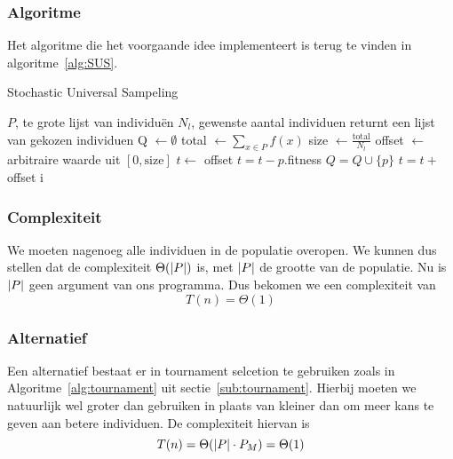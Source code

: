 \subsubsection{Algoritme}
Het algoritme die het voorgaande idee implementeert is terug te vinden in algoritme~\ref{alg:SUS}.
	\begin{algorithm}
	 	\caption{Stochastic Universal Sampeling}
		\begin{algorithmic}
		\Require 
			\State $P$, te grote lijst van individuën 
			\State $N_l$, gewenste aantal individuen
		\Ensure returnt een lijst van gekozen individuen
		\State Q $\gets \emptyset$
		\State total $\gets \sum_{x \in P} f(x)$ 
		\State size $\gets \frac{\text{total}}{N_l}$
		\State offset $\gets$ arbitraire waarde uit $\left\lbrack 0,\text{size} \right\rbrack$
		\State $t \gets$ offset
		\State $t = t-p.$fitness
			\State $Q = Q \cup \lbrace p \rbrace$
			\State $t = t+$offset
		\EndIf
		\EndFor		
		\State \Return i
		\EndFunction

		
		\end{algorithmic}
		\label{alg:SUS}
	\end{algorithm}		

\subsubsection{Complexiteit}
\label{ssub:SUSComplexity}
We moeten nagenoeg alle individuen in de populatie overopen. We kunnen dus stellen dat de complexiteit $ \Theta(\lvert P \rvert)$ is, met $\lvert P \rvert$ de grootte van de populatie. Nu is $\lvert P \rvert$ geen argument van ons programma. Dus bekomen we een complexiteit van \[T(n) = \Theta(1)\]

\subsubsection{Alternatief}
\label{sec:positiveTournament}
Een alternatief bestaat er in tournament selcetion te gebruiken zoals in Algoritme~\ref{alg:tournament} uit sectie~\ref{sub:tournament}. Hierbij moeten we natuurlijk wel groter dan gebruiken in plaats van kleiner dan om meer kans te geven aan betere individuen. De complexiteit hiervan is  \[T(n) = \Theta(\lvert P \rvert \cdot P_M) = \Theta(1)\]

%